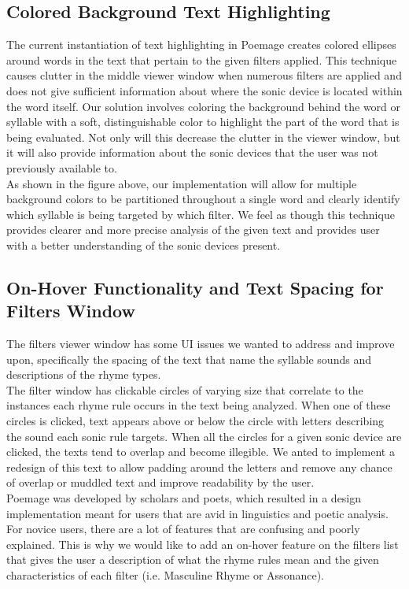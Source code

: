 \documentclass[journal]{vgtc}                %
\begin{document}
\subsection{Colored Background Text Highlighting}
The current instantiation of text highlighting in Poemage creates colored ellipses around words in the text that pertain to the given filters applied. This technique causes clutter in the middle viewer window when numerous filters are applied and does not give sufficient information about where the sonic device is located within the word itself. Our solution involves coloring the background behind the word or syllable with a soft, distinguishable color to highlight the part of the word that is being evaluated. Not only will this decrease the clutter in the viewer window, but it will also provide information about the sonic devices that the user was not previously available to.\\ 
\indent As shown in the figure above, our implementation will allow for multiple background colors to be partitioned throughout a single word and clearly identify which syllable is being targeted by which filter. We feel as though this technique provides clearer and more precise analysis of the given text and provides user with a better understanding of the sonic devices present.
\subsection{On-Hover Functionality and Text Spacing for Filters Window}
The filters viewer window has some UI issues we wanted to address and improve upon, specifically the spacing of the text that name the syllable sounds and descriptions of the rhyme types.\\
\indent The filter window has clickable circles of varying size that correlate to the instances each rhyme rule occurs in the text being analyzed. When one of these circles is clicked, text appears above or below the circle with letters describing the sound each sonic rule targets. When all the circles for a given sonic device are clicked, the texts tend to overlap and become illegible. We anted to implement a redesign of this text to allow padding around the letters and remove any chance of overlap or muddled text and improve readability by the user.\\
\indent Poemage was developed by scholars and poets, which resulted in a design implementation meant for users that are avid in linguistics and poetic analysis. For novice users, there are a lot of features that are confusing and poorly explained. This is why we would like to add an on-hover feature on the filters list that gives the user a description of what the rhyme rules mean and the given characteristics of each filter (i.e. Masculine Rhyme or Assonance).
\end{document}
